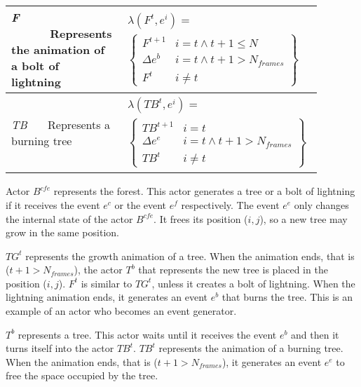 \documentclass[10pt,journal,letterpaper,compsoc]{IEEEtran}
\begin{document}
\begin{table}[h]
\begin{small}
\begin{center}
\begin{tabular}{|p{0.18\linewidth}|p{0.7\linewidth}|}
    \hline \textit{F} \ \ \  \ \ \  Represents the animation of a bolt of lightning  &
    $\begin{array}{l}
    \lambda (F^{t},e^{i}) =\\
    \left\{
    \begin{array}{ll}
        F^{t+1} & i=t\wedge t+1 \leqslant N \\
        \Delta e^{b}    & i=t\wedge t+1>N_{frames} \\
        F^{t} & i\neq t
    \end{array}\right\}
    \end{array}$ \\

    \hline \textit{TB} \ \ \  Represents a burning tree &
    $\begin{array}{l}
    \lambda(TB^{t},e^{i}) =\\
    \left\{
    \begin{array}{ll}
        TB^{t+1}    & i=t \\
        \Delta e^{e}  & i=t \wedge  t+1>N_{frames} \\
        TB^{t}   & i \neq t
    \end{array}\right\}
    \end{array}$ \\

    \hline

\end{tabular}
\end{center}
\end{small}
\end{table}


Actor $B^{cfe}$ represents the forest. This actor generates a tree or a bolt of lightning if it receives the event $e^{c}$ or the event $e^{f}$ respectively. The event $e^{e}$ only changes the internal state of the actor $B^{cfe}$. It frees its position ($i, j$), so a new tree may grow in the same position.

$TG^{t}$ represents the growth animation of a tree. When the animation ends, that is ($t + 1 > N_{frames}$), the actor $T^{b}$ that represents the new tree is placed in the position ($i, j$). $F^{t}$ is similar to $TG^{t}$, unless it creates a bolt of lightning. When the lightning animation ends, it generates an event $e^{b}$ that burns the tree. This is an example of an actor who becomes an event generator.

$T^{b}$ represents a tree. This actor waits until it receives the event $e^{b}$ and then it turns itself into the actor $TB^{t}$. $TB^{t}$ represents the animation of a burning tree. When the animation ends, that is ($t + 1 > N_{frames}$), it generates an event $e^{e}$ to free the space occupied by the tree.
\end{document}
